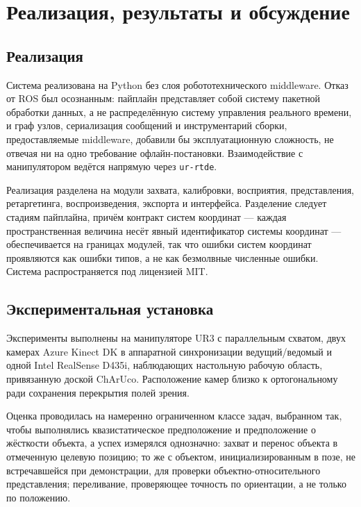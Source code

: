 \documentclass[12pt, a4paper, oneside]{report}
\begin{document}
\chapter{Реализация, результаты и обсуждение}

\section{Реализация}

Система реализована на Python без слоя робототехнического middleware. Отказ от
ROS был осознанным: пайплайн представляет собой систему пакетной обработки
данных, а не распределённую систему управления реального времени, и граф узлов,
сериализация сообщений и инструментарий сборки, предоставляемые middleware,
добавили бы эксплуатационную сложность, не отвечая ни на одно требование
офлайн-постановки. Взаимодействие с манипулятором ведётся напрямую через
\texttt{ur-rtde}.

Реализация разделена на модули захвата, калибровки, восприятия, представления,
ретаргетинга, воспроизведения, экспорта и интерфейса. Разделение следует стадиям
пайплайна, причём контракт систем координат --- каждая пространственная величина
несёт явный идентификатор системы координат --- обеспечивается на границах
модулей, так что ошибки систем координат проявляются как ошибки типов, а не как
безмолвные численные ошибки. Система распространяется под лицензией MIT.

\section{Экспериментальная установка}

Эксперименты выполнены на манипуляторе UR3 с параллельным схватом, двух камерах
Azure Kinect DK в аппаратной синхронизации ведущий/ведомый и одной Intel
RealSense D435i, наблюдающих настольную рабочую область, привязанную доской
ChArUco. Расположение камер близко к ортогональному ради сохранения перекрытия
полей зрения.

Оценка проводилась на намеренно ограниченном классе задач, выбранном так, чтобы
выполнялись квазистатическое предположение и предположение о жёсткости объекта, а
успех измерялся однозначно: захват и перенос объекта в отмеченную целевую
позицию; то же с объектом, инициализированным в позе, не встречавшейся при
демонстрации, для проверки объектно-относительного представления; переливание,
проверяющее точность по ориентации, а не только по положению.
\end{document}
